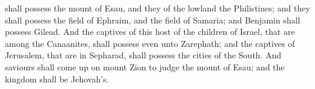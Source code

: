 shall possess the mount of Esau, and they of the lowland the Philistines; and they shall possess the field of Ephraim, and the field of Samaria; and Benjamin shall possess Gilead. And the captives of this host of the children of Israel, that are among the Canaanites, shall possess even unto Zarephath; and the captives of Jerusalem, that are in Sepharad, shall possess the cities of the South. And saviours shall come up on mount Zion to judge the mount of Esau; and the kingdom shall be Jehovah’s. 